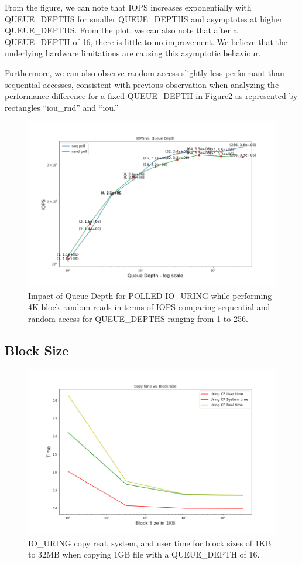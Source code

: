 \documentclass{article}
\begin{document}
From the figure, we can note that IOPS increases exponentially with QUEUE\_DEPTHS for smaller QUEUE\_DEPTHS and asymptotes at 
higher QUEUE\_DEPTHS. From the plot, we can also note that after a QUEUE\_DEPTH of 16, there is little to no improvement. We 
believe that the underlying hardware limitations are causing this asymptotic behaviour.

Furthermore, we can also observe random access slightly less performant than sequential accesses, 
consistent with previous observation when analyzing the performance 
difference for a fixed QUEUE\_DEPTH in Figure2 as represented by rectangles “iou\_rnd” and “iou.”

\begin{figure}
    \centering
    \includegraphics[scale = 0.4]{queue_depth.png}
    \caption{Impact of Queue Depth for POLLED IO\_URING while performing 4K block random reads in terms of 
    IOPS comparing sequential and random access for QUEUE\_DEPTHS ranging from 1 to 256.}
    \label{Figure3}
\end{figure}

\subsection{Block Size}
\begin{figure}
    \centering
    \includegraphics[scale = 0.4]{cp_bs.png}
    \caption{IO\_URING copy real, system, and user time for block sizes of 1KB to 32MB when copying 
    1GB file with a QUEUE\_DEPTH of 16.}
    \label{Figure5}
\end{figure}
\end{document}
